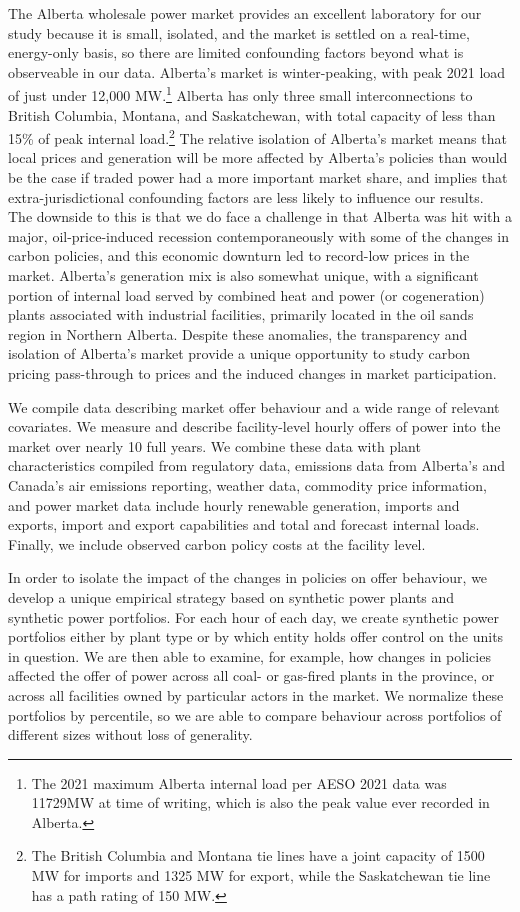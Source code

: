 \documentclass[12pt]{article}
\begin{document}
The Alberta wholesale power market provides an excellent laboratory for our study because it is small, isolated, and the market is settled on a real-time, energy-only basis, so there are limited confounding factors beyond what is observeable in our data. Alberta's market is winter-peaking, with peak 2021 load of just under 12,000 MW.\footnote{The 2021 maximum Alberta internal load per AESO 2021 data was 11729MW at time of writing, which is also the peak value ever recorded in Alberta.}  Alberta has only three small interconnections to British Columbia, Montana, and Saskatchewan, with total capacity of less than 15\% of peak internal load.\footnote{The British Columbia and Montana tie lines have a joint capacity of 1500 MW for imports and 1325 MW for export, while the Saskatchewan tie line has a path rating of 150 MW.} The relative isolation of Alberta's market means that local prices and generation will be more affected by Alberta's policies than would be the case if traded power had a more important market share, and implies that extra-jurisdictional confounding factors are less likely to influence our results. The downside to this is that we do face a challenge in that Alberta was hit with a major, oil-price-induced recession contemporaneously with some of the changes in carbon policies, and this economic downturn led to record-low prices in the market. Alberta's generation mix is also somewhat unique, with a significant portion of internal load served by combined heat and power (or cogeneration) plants associated with industrial facilities, primarily located in the oil sands region in Northern Alberta. Despite these anomalies, the transparency and isolation of Alberta's market provide a unique opportunity to study carbon pricing pass-through to prices and the induced changes in market participation.

We compile data describing market offer behaviour and a wide range of relevant covariates.  We measure and describe facility-level hourly offers of power into the market over nearly 10 full years.  We combine these data with plant characteristics compiled from regulatory data, emissions data from Alberta's and Canada's air emissions reporting, weather data, commodity price information, and power market data include hourly renewable generation, imports and exports, import and export capabilities and total and forecast internal loads.  Finally, we include observed carbon policy costs at the facility level.

In order to isolate the impact of the changes in policies on offer behaviour, we develop a unique empirical strategy based on synthetic power plants and synthetic power portfolios.  For each hour of each day, we create synthetic power portfolios either by plant type or by which entity holds offer control on the units in question.  We are then able to examine, for example, how changes in policies affected the offer of power across all coal- or gas-fired plants in the province, or across all facilities owned by particular actors in the market.  We normalize these portfolios by percentile, so we are able to compare behaviour across portfolios of different sizes without loss of generality.
\end{document}
